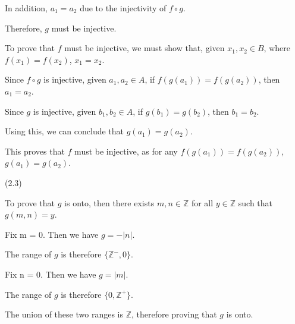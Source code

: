 \documentclass{exam}
\begin{document}
\begin{questions}
\begin{subparts}
\begin{center}
In addition, \(a_1 = a_2\) due to the injectivity of \(f \circ g\).

Therefore, \(g\) must be injective.

\end{center}
\vspace{5px}


\begin{center}

To prove that \(f\) must be injective, we must show that, given \(x_1, x_2 \in B\), where \(f(x_1) = f(x_2)\), \(x_1 = x_2\).

Since \(f \circ g\) is injective, given \(a_1, a_2 \in A\), if \(f(g(a_1)) = f(g(a_2))\), then \(a_1 = a_2\).

Since \(g\) is injective, given \(b_1, b_2 \in A\), if \(g(b_1) = g(b_2)\), then \(b_1 = b_2\).

Using this, we can conclude that \(g(a_1) = g(a_2)\).

This proves that \(f\) must be injective, as for any \(f(g(a_1)) = f(g(a_2))\), \(g(a_1) = g(a_2)\).

\end{center}

\end{subparts}

 (2.3)

\begin{center}

To prove that \(g\) is onto, then there exists \(m, n \in \mathbb{Z}\) for all \(y \in \mathbb{Z}\) such that \(g(m,n) = y\).

Fix m = 0. Then we have \(g = -|n|\).

The range of \(g\) is therefore \(\{\mathbb{Z^-}, 0\} \).

Fix n = 0. Then we have \(g = |m|\).

The range of \(g\) is therefore \(\{0, \mathbb{Z^+}\} \).

The union of these two ranges is \(\mathbb{Z}\), therefore proving that \(g\) is onto.

\end{center}

\begin{subparts}


\end{subparts}
\end{questions}
\end{document}
